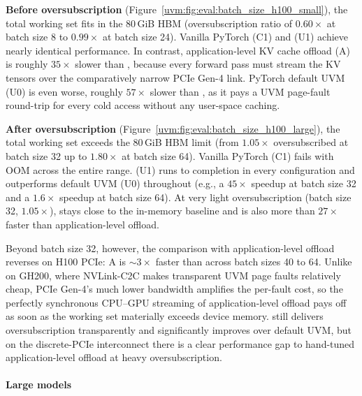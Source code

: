 \textbf{Before oversubscription} (Figure~\ref{uvm:fig:eval:batch_size_h100_small}),
    the total working set fits in the 80\,GiB HBM
    (oversubscription ratio of $0.60\times$ at batch size 8 to $0.99\times$ at batch size 24).
Vanilla PyTorch (C1) and {\uvmname} (U1) achieve nearly identical performance.
In contrast, application-level KV cache offload (A) is roughly $35\times$ slower than {\uvmname},
    because every forward pass must stream the KV tensors
    over the comparatively narrow PCIe Gen-4 link.
PyTorch default UVM (U0) is even worse,
    roughly $57\times$ slower than {\uvmname},
    as it pays a UVM page-fault round-trip for every cold access
    without any user-space caching.

\textbf{After oversubscription} (Figure~\ref{uvm:fig:eval:batch_size_h100_large}),
    the total working set exceeds the 80\,GiB HBM limit
    (from $1.05\times$ oversubscribed at batch size 32
    up to $1.80\times$ at batch size 64).
Vanilla PyTorch (C1) fails with OOM across the entire range.
{\uvmname} (U1) runs to completion in every configuration
    and outperforms default UVM (U0) throughout
    (e.g., a $45\times$ speedup at batch size 32 and a $1.6\times$ speedup at batch size 64).
At very light oversubscription (batch size 32, $1.05\times$),
    {\uvmname} stays close to the in-memory baseline
    and is also more than $27\times$ faster than application-level offload.

Beyond batch size 32, however,
    the comparison with application-level offload reverses on H100 PCIe:
    A is $\sim$$3\times$ faster than {\uvmname} across batch sizes 40 to 64.
Unlike on GH200, where NVLink-C2C makes transparent UVM page faults relatively cheap,
    PCIe Gen-4's much lower bandwidth amplifies the per-fault cost,
    so the perfectly synchronous CPU--GPU streaming of application-level offload pays off
    as soon as the working set materially exceeds device memory.
{\uvmname} still delivers oversubscription transparently
    and significantly improves over default UVM,
    but on the discrete-PCIe interconnect
    there is a clear performance gap to hand-tuned application-level offload
    at heavy oversubscription.

\paragraph{Large models}
\label{uvm:sec:eval:oversub:models}

